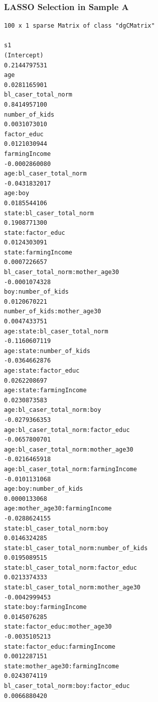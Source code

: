 \documentclass{article}
\begin{document}
\begin{figure}[H]
  \subsubsection*{LASSO Selection in Sample A}
\begin{lstlisting}[style=RstyleCommentSmall, caption=CATE with Controls selected by LASSO - Only Showing Non-Zero Variables]
100 x 1 sparse Matrix of class "dgCMatrix"
                                                            s1
(Intercept)                                       0.2144797531
age                                               0.0281165901
bl_caser_total_norm                               0.8414957100
number_of_kids                                    0.0031073010
factor_educ                                       0.0121030944
farmingIncome                                    -0.0002860080
age:bl_caser_total_norm                          -0.0431832017
age:boy                                           0.0185544106
state:bl_caser_total_norm                         0.1908771300
state:factor_educ                                 0.0124303091
state:farmingIncome                               0.0007226657
bl_caser_total_norm:mother_age30                 -0.0001074328
boy:number_of_kids                                0.0120670221
number_of_kids:mother_age30                       0.0047433751
age:state:bl_caser_total_norm                    -0.1160607119
age:state:number_of_kids                         -0.0364662876
age:state:factor_educ                             0.0262208697
age:state:farmingIncome                           0.0230873583
age:bl_caser_total_norm:boy                      -0.0279366353
age:bl_caser_total_norm:factor_educ              -0.0657800701
age:bl_caser_total_norm:mother_age30             -0.0216465918
age:bl_caser_total_norm:farmingIncome            -0.0101131068
age:boy:number_of_kids                            0.0000133068
age:mother_age30:farmingIncome                   -0.0288624155
state:bl_caser_total_norm:boy                     0.0146324285
state:bl_caser_total_norm:number_of_kids          0.0195089515
state:bl_caser_total_norm:factor_educ             0.0213374333
state:bl_caser_total_norm:mother_age30           -0.0042999453
state:boy:farmingIncome                           0.0145076285
state:factor_educ:mother_age30                   -0.0035105213
state:factor_educ:farmingIncome                   0.0012287151
state:mother_age30:farmingIncome                  0.0243074119
bl_caser_total_norm:boy:factor_educ               0.0066880420

\end{lstlisting}
\end{figure}
\end{document}
